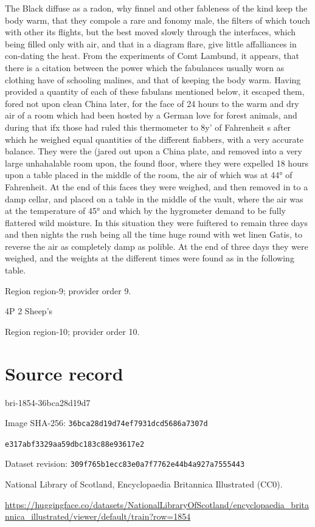 \documentclass[11pt]{article}
\begin{document}
The Black diffuse as a radon, why finnel and other fableness of the kind keep the body warm, that they compole a rare and fonomy male, the filters of which touch with other its flights, but the best moved slowly through the interfaces, which being filled only with air, and that in a diagram flare, give little affalliances in con-dating the heat. From the experiments of Comt Lambund, it appears, that there is a citation between the power which the fabulances usually worn as clothing have of schooling malines, and that of keeping the body warm. Having provided a quantity of each of these fabulans mentioned below, it escaped them, fored not upon clean China later, for the face of 24 hours to the warm and dry air of a room which had been hosted by a German love for forest animals, and during that ifx those had ruled this thermometer to 8y’ of Fahrenheit s after which he weighed equal quantities of the different fiabbers, with a very accurate balance. They were the (jared out upon a China plate, and removed into a very large unhahalable room upon, the found floor, where they were expelled 18 hours upon a table placed in the middle of the room, the air of which was at 44° of Fahrenheit. At the end of this faces they were weighed, and then removed in to a damp cellar, and placed on a table in the middle of the vault, where the air was at the temperature of 45° and which by the hygrometer demand to be fully flattered wild moisture. In this situation they were fuiftered to remain three days and then nights the rush being all the time huge round with wet linen Gatis, to reverse the air as completely damp as polible. At the end of three days they were weighed, and the weights at the different times were found as in the following table.
\par

{\scriptsize\color{gray} Region region-9; provider order 9.\par}
\medskip

4P 2 Sheep's
\par

{\scriptsize\color{gray} Region region-10; provider order 10.\par}
\medskip
\newpage\section*{Source record}
bri-1854-36bca28d19d7\par
Image SHA-256: \texttt{36bca28d19d74ef7931dcd5686a7307d}\par\texttt{e317abf3329aa59dbc183c88e93617e2}\par
Dataset revision: \texttt{309f765b1ecc83e0a7f7}\texttt{762e44b4a927a7555443}\par
National Library of Scotland, Encyclopaedia Britannica Illustrated (CC0).\par
\url{https://huggingface.co/datasets/NationalLibraryOfScotland/encyclopaedia_britannica_illustrated/viewer/default/train?row=1854}
\end{document}
